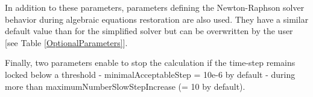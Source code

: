 \documentclass[a4paper, 12pt]{report}
\begin{document}
In addition to these parameters, parameters defining the Newton-Raphson solver behavior during algebraic equations restoration are also used. They have a similar default value than for the simplified solver but can be overwritten by the user [see Table \ref{OptionalParameters}].

Finally, two parameters enable to stop the calculation if the time-step remains locked below a threshold - minimalAcceptableStep = 10e-6 by default - during more than
maximumNumberSlowStepIncrease (= 10 by default).


\end{document}
